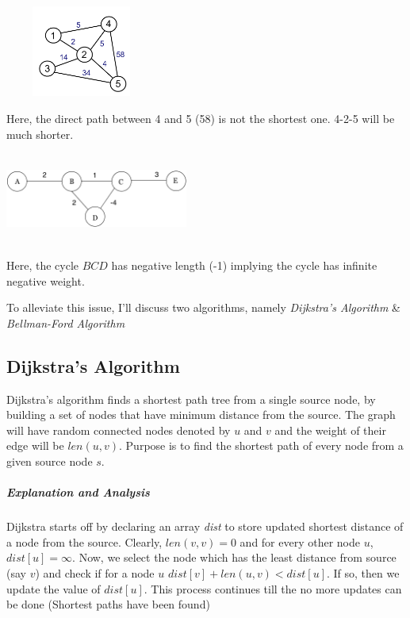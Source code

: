 \documentclass[11pt,a4paper]{extarticle}
\begin{document}
\begin{multicols}{2}

\begin{center}
	\includegraphics[width=5cm, height=3cm]{shortest}
\end{center}
Here, the direct path between 4 and 5 (58) is not the shortest one. 4-2-5 will be much shorter.

\columnbreak

\begin{center}
	\includegraphics[width=6cm, height=3cm]{negative}
\end{center}

Here, the cycle $BCD$ has negative length (-1) implying the cycle has infinite negative weight.

\end{multicols}

To alleviate this issue, I'll discuss two algorithms, namely \textit{Dijkstra's Algorithm} \& \textit{Bellman-Ford Algorithm}

\subsection{Dijkstra's Algorithm}
Dijkstra’s algorithm finds a shortest path tree from a single source node, by building a set of nodes that have minimum distance from the source. The graph will have random connected nodes denoted by $u$ and $v$ and the weight of their edge will be $len(u,v)$. Purpose is to find the shortest path of every node from a given source node $s$.

\begin{adjustwidth}{2.5em}{0pt}

\end{adjustwidth}

\subparagraph{Explanation and Analysis}
Dijkstra starts off by declaring an array \textit{dist} to store updated shortest distance of a node from the source. Clearly, $len(v,v) = 0$ and for every other node $u$, $dist[u] = \infty$. Now, we select the node which has the least distance from source (say $v$) and check if for a node $u$ $dist[v] + len(u,v) < dist[u]$. If so, then we update the value of $dist[u]$. This process continues till the no more updates can be done (Shortest paths have been found)
\end{document}
